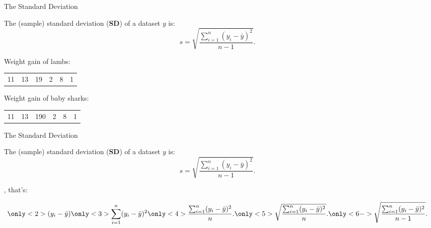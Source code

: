 \begin{frame}{The Standard Deviation}

    The (sample) standard deviation (\textbf{SD}) of a dataset $y$ is:
    \[
        s = \sqrt{\frac{\sum_{i=1}^n (y_i - \bar y)^2 }{ n-1 } } .
    \]


    \vspace{3em}
    \pause

     Weight gain of lambs:
    \begin{center}
        \begin{tabular}{cccccc}
            11 & 13 & 19 & 2 & \alert{8} & 1
        \end{tabular}
    \end{center}

    \pause

    \vspace{3em}

     Weight gain of baby sharks:
    \begin{center}
        \begin{tabular}{cccccc}
            11 & 13 & 190 & 2 & \alert{8} & 1
        \end{tabular}
    \end{center}

\end{frame}

\begin{frame}{The Standard Deviation}

    The (sample) standard deviation (\textbf{SD}) of a dataset $y$ is:
    \[
        s = \sqrt{\frac{\sum_{i=1}^n (y_i - \bar y)^2 }{ n-1 } } .
    \]

    \vspace{2em}
    \pause

    , that's:

\centering
{} 

\[
    \only<2>{(y_i - \bar y) }
    \only<3>{ \sum_{i=1}^n (y_i - \bar y)^2 }
    \only<4>{{\frac{\sum_{i=1}^n (y_i - \bar y)^2 }{ n } } .}
    \only<5>{\sqrt{\frac{\sum_{i=1}^n (y_i - \bar y)^2 }{ n } } .}
    \only<6->{\sqrt{\frac{\sum_{i=1}^n (y_i - \bar y)^2 }{ n-1 } } .}
\]

\end{frame}


